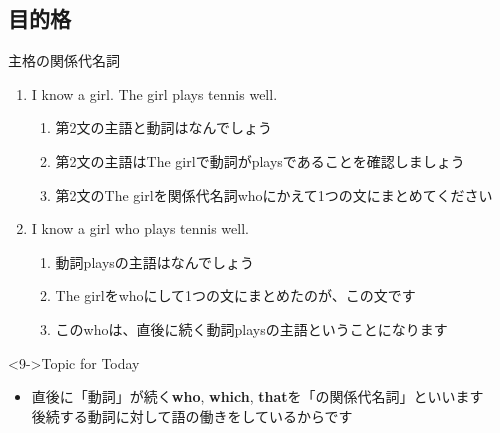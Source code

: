 \documentclass[aspectratio=169,xcolor={dvipsnames,table}]{beamer}
\begin{document}
\subsection{目的格}
\begin{frame}[plain,t]{主格の関係代名詞}

\begin{enumerate}
 \item<1-> I know a girl. The girl plays tennis well.
       \begin{enumerate}
	\item<2-> 第2文の主語と動詞はなんでしょう
	\item<3-> 第2文の主語はThe girlで動詞がplaysであることを確認しましょう
	\item<4-> 第2文のThe girlを関係代名詞whoにかえて1つの文にまとめてください
       \end{enumerate}
 \item<5-> I know a girl who plays tennis well.
       \begin{enumerate}
	\item<6-> 動詞playsの主語はなんでしょう
	\item<7-> The girlをwhoにして1つの文にまとめたのが、この文です
	\item<8-> このwhoは、直後に続く動詞playsの主語ということになります
       \end{enumerate}
\end{enumerate}


\vspace{25pt}


\begin{block}<9->{Topic for Today}
\small
\small
 \begin{itemize}[square]
  \item  直後に「動詞」が続く\textbf{who}, \textbf{which}, \textbf{that}を「の関係代名詞」といいます\\
\hfill{\scriptsize 後続する動詞に対して語の働きをしているからです}\raisebox{0pt}{\dbend}\\
\mbox{}
\end{itemize}
     \end{block}

\end{frame}
\end{document}
